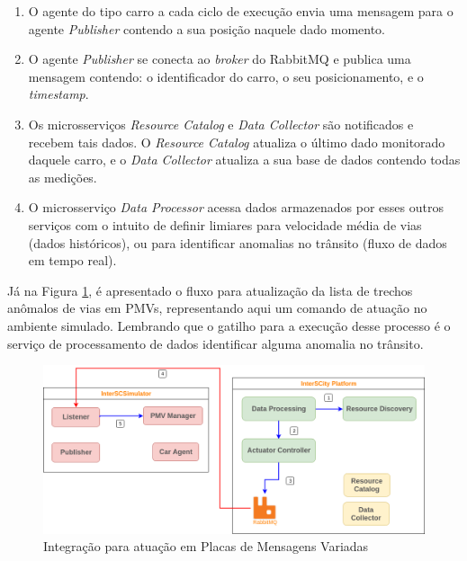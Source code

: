 \begin{enumerate}
    \item O agente do tipo carro a cada ciclo de execução envia uma mensagem para o agente \textit{Publisher} contendo a sua posição naquele dado momento.

    \item O agente \textit{Publisher} se conecta ao \textit{broker} do RabbitMQ e publica uma mensagem contendo: o identificador do carro, o seu posicionamento, e o \textit{timestamp}.

    \item Os microsserviços \textit{Resource Catalog} e \textit{Data Collector} são notificados e recebem tais dados. O \textit{Resource Catalog} atualiza o último dado monitorado
        daquele carro, e o \textit{Data Collector} atualiza a sua base de dados contendo todas as medições.

    \item O microsserviço \textit{Data Processor} acessa dados armazenados por esses outros serviços com o intuito de definir limiares para velocidade média de vias (dados históricos),
        ou para identificar anomalias no trânsito (fluxo de dados em tempo real).
\end{enumerate}

Já na Figura \ref{fig:smart_traffic_actuation}, é apresentado o fluxo para atualização da lista de trechos anômalos de vias em PMVs, representando aqui um comando de atuação no
ambiente simulado.
Lembrando que o gatilho para a execução desse processo é o serviço de processamento de dados identificar alguma anomalia no trânsito.

\begin{figure}[ht]
	\centering
	\includegraphics[width=\textwidth]{figuras/integration-actuate-pmv.png}
	\caption{Integração para atuação em Placas de Mensagens Variadas}
	\label{fig:smart_traffic_actuation}
\end{figure}

